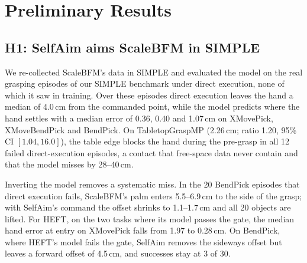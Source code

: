 \documentclass[conference]{IEEEtran}
\begin{document}
\section{Preliminary Results}\label{sec:prelim}

\subsection{H1: SelfAim aims ScaleBFM in SIMPLE}
We re-collected ScaleBFM's data in SIMPLE and evaluated the model on the real grasping episodes of our SIMPLE benchmark under direct execution, none of which it saw in training. Over these episodes direct execution leaves the hand a median of 4.0\,cm from the commanded point, while the model predicts where the hand settles with a median error of 0.36, 0.40 and 1.07\,cm on XMovePick, XMoveBendPick and BendPick. On TabletopGraspMP (2.26\,cm; ratio 1.20, 95\% CI $[1.04,16.0]$), the table edge blocks the hand during the pre-grasp in all 12 failed direct-execution episodes, a contact that free-space data never contain and that the model misses by 28--40\,cm.

Inverting the model removes a systematic miss. In the 20 BendPick episodes that direct execution fails, ScaleBFM's palm enters 5.5--6.9\,cm to the side of the grasp; with SelfAim's command the offset shrinks to 1.1--1.7\,cm and all 20 objects are lifted. For HEFT, on the two tasks where its model passes the gate, the median hand error at entry on XMovePick falls from 1.97 to 0.28\,cm. On BendPick, where HEFT's model fails the gate, SelfAim removes the sideways offset but leaves a forward offset of 4.5\,cm, and successes stay at 3 of 30.
\end{document}
